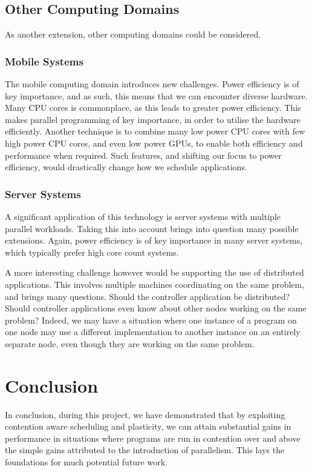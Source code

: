 \subsection{Other Computing Domains}
\label{section:conclusion_and_future_work:other_computing_domains}

As another extension, other computing domains could be considered.

\subsubsection{Mobile Systems}
\label{section:conclusion_and_future_work:mobile_systems}

The mobile computing domain introduces new challenges. Power efficiency is of key importance, and as such, this means that we can encounter diverse hardware. Many CPU cores is commonplace, as this leads to greater power efficiency. This makes parallel programming of key importance, in order to utilise the hardware efficiently. Another technique is to combine many low power CPU cores with few high power CPU cores, and even low power GPUs, to enable both efficiency and performance when required. Such features, and shifting our focus to power efficiency, would drastically change how we schedule applications.



\subsubsection{Server Systems}
\label{section:conclusion_and_future_work:server_systems}

A significant application of this technology is server systems with multiple parallel workloads. Taking this into account brings into question many possible extensions. Again, power efficiency is of key importance in many server systems, which typically prefer high core count systems. 

A more interesting challenge however would be supporting the use of distributed applications. This involves multiple machines coordinating on the same problem, and brings many questions. Should the controller application be distributed? Should controller applications even know about other nodes working on the same problem? Indeed, we may have a situation where one instance of a program on one node may use a different implementation to another instance on an entirely separate node, even though they are working on the same problem.



\section{Conclusion}

In conclusion, during this project, we have demonstrated that by exploiting contention aware scheduling and plasticity, we can attain substantial gains in performance in situations where programs are run in contention over and above the simple gains attributed to the introduction of parallelism. This lays the foundations for much potential future work.